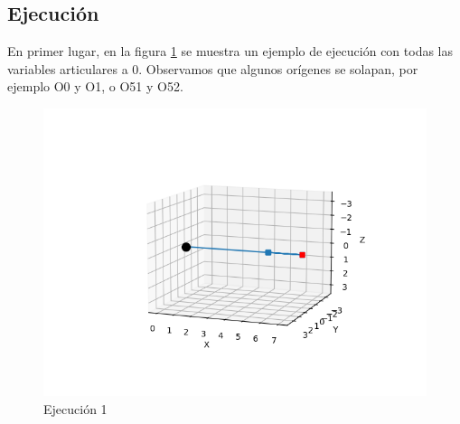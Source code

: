 \subsection{Ejecución}
En primer lugar, en la figura \ref{chapter:ejecucion1} se muestra un ejemplo de ejecución con todas las variables articulares a 0. Observamos que algunos orígenes se solapan, por ejemplo O0 y O1, o O51 y O52.
\begin{figure}[htb]
   \centering
   \includegraphics[width=0.8\linewidth]{images/cin_dir_4.png}
   \caption{Ejecución 1}
   \label{chapter:ejecucion1}
\end{figure}

